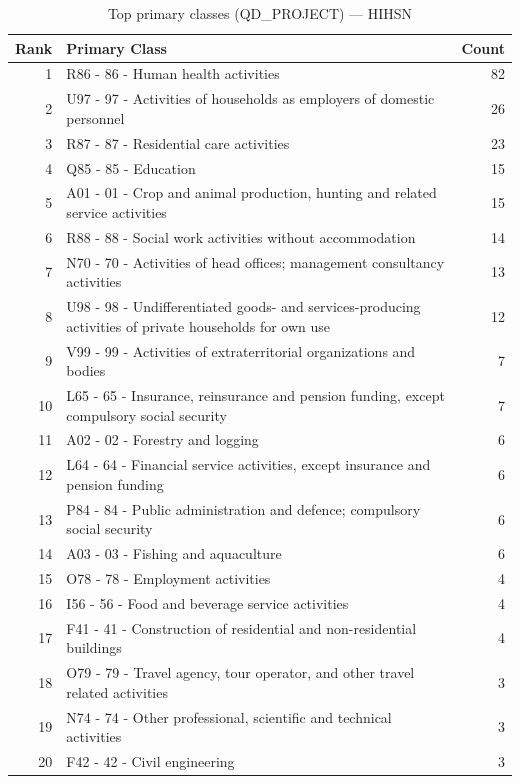 \begin{table}[H]
    \centering
    \begin{tabular}{r p{10cm} r}
    \hline
    \textbf{Rank} & \textbf{Primary Class} & \textbf{Count} \\
    \hline
    1 & R86 - 86 - Human health activities & 82 \\
    2 & U97 - 97 - Activities of households as employers of domestic personnel & 26 \\
    3 & R87 - 87 - Residential care activities & 23 \\
    4 & Q85 - 85 - Education & 15 \\
    5 & A01 - 01 - Crop and animal production, hunting and related service activities & 15 \\
    6 & R88 - 88 - Social work activities without accommodation & 14 \\
    7 & N70 - 70 - Activities of head offices; management consultancy activities & 13 \\
    8 & U98 - 98 - Undifferentiated goods- and services-producing activities of private households for own use & 12 \\
    9 & V99 - 99 - Activities of extraterritorial organizations and bodies & 7 \\
    10 & L65 - 65 - Insurance, reinsurance and pension funding, except compulsory social security & 7 \\
    11 & A02 - 02 - Forestry and logging & 6 \\
    12 & L64 - 64 - Financial service activities, except insurance and pension funding & 6 \\
    13 & P84 - 84 - Public administration and defence; compulsory social security & 6 \\
    14 & A03 - 03 - Fishing and aquaculture & 6 \\
    15 & O78 - 78 - Employment activities & 4 \\
    16 & I56 - 56 - Food and beverage service activities & 4 \\
    17 & F41 - 41 - Construction of residential and non-residential buildings & 4 \\
    18 & O79 - 79 - Travel agency, tour operator, and other travel related activities & 3 \\
    19 & N74 - 74 - Other professional, scientific and technical activities & 3 \\
    20 & F42 - 42 - Civil engineering & 3 \\
    \hline
    \end{tabular}
    \caption{Top primary classes (QD\_PROJECT) --- HIHSN}
\end{table}

